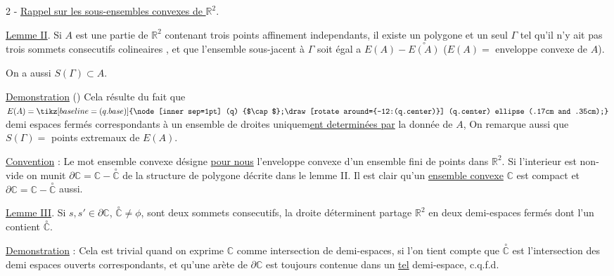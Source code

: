2 - \uline{Rappel sur les sous-ensembles convexes de $\mathbb{R}^{2}$}.

\margin{!}\uline{Lemme II}. Si $A$ est une partie  de $\mathbb{R}^{2}$ contenant trois points affinement independants, il existe un polygone et un seul $\Gamma$ tel qu'il n'y ait pas trois sommets consecutifs colineaires , et  que l'ensemble sous-jacent à $\Gamma$ soit égal a $E(A)-\overset{\circ}{E(A)}$ ($E(A)=$ enveloppe convexe de $A$).

On a aussi $S(\Gamma)\subset A$.

%
\uline{Demonstration} () Cela résulte du fait que $E(A)=\tikz[baseline=(q.base)]{\node[inner sep=1pt] (q) {$\cap$};\draw[rotate around={-12:(q.center)}] (q.center) ellipse (.17cm and .35cm);}$ demi espaces fermés correspondants à un ensemble de droites uniquem\uline{ent determinées par} la donnée de $A$, On remarque aussi que $S(\Gamma)=$  points extremaux de $E(A)$.

%
\uline{Convention} : Le mot ensemble convexe désigne \uline{pour nous} l'enveloppe convexe d'un ensemble fini de points dans $\mathbb{R}^{2}$.  Si l'interieur est non-vide on munit $\partial\mathbb{C}=\mathbb{C}-\overset{\circ}{\mathbb{C}}$ de la structure de polygone décrite dans le lemme II. Il est clair qu'un \uline{ensemble convexe} $\mathbb{C}$ est compact et  $\partial\mathbb{C}=\mathbb{C}-\overset{\circ}{\mathbb{C}}$ aussi.

\uline{Lemme III}. Si $s,s'\in\partial\mathbb{C}$, $\overset{\circ}{\mathbb{C}}\ne\phi$, sont deux sommets consecutifs, la droite   déterminent partage $\mathbb{R}^{2}$ en deux demi-espaces fermés dont l'un contient $\overset{\circ}{\mathbb{C}}$.

%
\uline{Demonstration} : Cela est trivial quand on exprime $\mathbb{C}$ comme intersection de demi-espaces, si l'on tient compte que $\overset{\circ}{\mathbb{C}}$ est l'intersection des demi espaces ouverts correspondants, et qu'une arète de $\partial\mathbb{C}$ est toujours contenue dans un \uline{tel} demi-espace, c.q.f.d.


